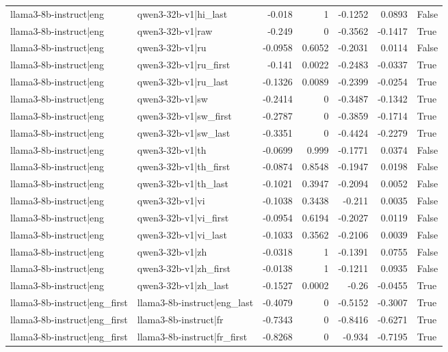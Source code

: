 \begin{table}
\begin{tabular}{l l r r r r l}
llama3-8b-instruct|eng & qwen3-32b-v1|hi_last & -0.018 & 1 & -0.1252 & 0.0893 & False \\
llama3-8b-instruct|eng & qwen3-32b-v1|raw & -0.249 & 0 & -0.3562 & -0.1417 & True \\
llama3-8b-instruct|eng & qwen3-32b-v1|ru & -0.0958 & 0.6052 & -0.2031 & 0.0114 & False \\
llama3-8b-instruct|eng & qwen3-32b-v1|ru_first & -0.141 & 0.0022 & -0.2483 & -0.0337 & True \\
llama3-8b-instruct|eng & qwen3-32b-v1|ru_last & -0.1326 & 0.0089 & -0.2399 & -0.0254 & True \\
llama3-8b-instruct|eng & qwen3-32b-v1|sw & -0.2414 & 0 & -0.3487 & -0.1342 & True \\
llama3-8b-instruct|eng & qwen3-32b-v1|sw_first & -0.2787 & 0 & -0.3859 & -0.1714 & True \\
llama3-8b-instruct|eng & qwen3-32b-v1|sw_last & -0.3351 & 0 & -0.4424 & -0.2279 & True \\
llama3-8b-instruct|eng & qwen3-32b-v1|th & -0.0699 & 0.999 & -0.1771 & 0.0374 & False \\
llama3-8b-instruct|eng & qwen3-32b-v1|th_first & -0.0874 & 0.8548 & -0.1947 & 0.0198 & False \\
llama3-8b-instruct|eng & qwen3-32b-v1|th_last & -0.1021 & 0.3947 & -0.2094 & 0.0052 & False \\
llama3-8b-instruct|eng & qwen3-32b-v1|vi & -0.1038 & 0.3438 & -0.211 & 0.0035 & False \\
llama3-8b-instruct|eng & qwen3-32b-v1|vi_first & -0.0954 & 0.6194 & -0.2027 & 0.0119 & False \\
llama3-8b-instruct|eng & qwen3-32b-v1|vi_last & -0.1033 & 0.3562 & -0.2106 & 0.0039 & False \\
llama3-8b-instruct|eng & qwen3-32b-v1|zh & -0.0318 & 1 & -0.1391 & 0.0755 & False \\
llama3-8b-instruct|eng & qwen3-32b-v1|zh_first & -0.0138 & 1 & -0.1211 & 0.0935 & False \\
llama3-8b-instruct|eng & qwen3-32b-v1|zh_last & -0.1527 & 0.0002 & -0.26 & -0.0455 & True \\
llama3-8b-instruct|eng_first & llama3-8b-instruct|eng_last & -0.4079 & 0 & -0.5152 & -0.3007 & True \\
llama3-8b-instruct|eng_first & llama3-8b-instruct|fr & -0.7343 & 0 & -0.8416 & -0.6271 & True \\
llama3-8b-instruct|eng_first & llama3-8b-instruct|fr_first & -0.8268 & 0 & -0.934 & -0.7195 & True \\

\end{tabular}
\end{table}
